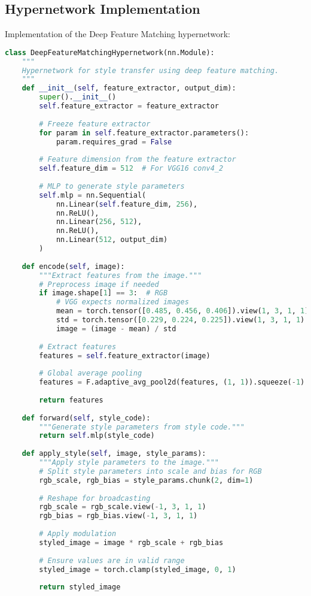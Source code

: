 \subsection{Hypernetwork Implementation}
Implementation of the Deep Feature Matching hypernetwork:

\begin{lstlisting}[language=Python]
class DeepFeatureMatchingHypernetwork(nn.Module):
    """
    Hypernetwork for style transfer using deep feature matching.
    """
    def __init__(self, feature_extractor, output_dim):
        super().__init__()
        self.feature_extractor = feature_extractor
        
        # Freeze feature extractor
        for param in self.feature_extractor.parameters():
            param.requires_grad = False
        
        # Feature dimension from the feature extractor
        self.feature_dim = 512  # For VGG16 conv4_2
        
        # MLP to generate style parameters
        self.mlp = nn.Sequential(
            nn.Linear(self.feature_dim, 256),
            nn.ReLU(),
            nn.Linear(256, 512),
            nn.ReLU(),
            nn.Linear(512, output_dim)
        )
    
    def encode(self, image):
        """Extract features from the image."""
        # Preprocess image if needed
        if image.shape[1] == 3:  # RGB
            # VGG expects normalized images
            mean = torch.tensor([0.485, 0.456, 0.406]).view(1, 3, 1, 1).to(image.device)
            std = torch.tensor([0.229, 0.224, 0.225]).view(1, 3, 1, 1).to(image.device)
            image = (image - mean) / std
        
        # Extract features
        features = self.feature_extractor(image)
        
        # Global average pooling
        features = F.adaptive_avg_pool2d(features, (1, 1)).squeeze(-1).squeeze(-1)
        
        return features
    
    def forward(self, style_code):
        """Generate style parameters from style code."""
        return self.mlp(style_code)
    
    def apply_style(self, image, style_params):
        """Apply style parameters to the image."""
        # Split style parameters into scale and bias for RGB
        rgb_scale, rgb_bias = style_params.chunk(2, dim=1)
        
        # Reshape for broadcasting
        rgb_scale = rgb_scale.view(-1, 3, 1, 1)
        rgb_bias = rgb_bias.view(-1, 3, 1, 1)
        
        # Apply modulation
        styled_image = image * rgb_scale + rgb_bias
        
        # Ensure values are in valid range
        styled_image = torch.clamp(styled_image, 0, 1)
        
        return styled_image
\end{lstlisting}


